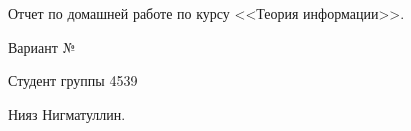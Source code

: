 
\begin{titlepage}

\begin{center}
\Large \Large Отчет по домашней работе по курсу <<Теория информации>>.
    
Вариант №
  
Студент группы 4539

Нияз Нигматуллин.
\end{center}

\end{titlepage}